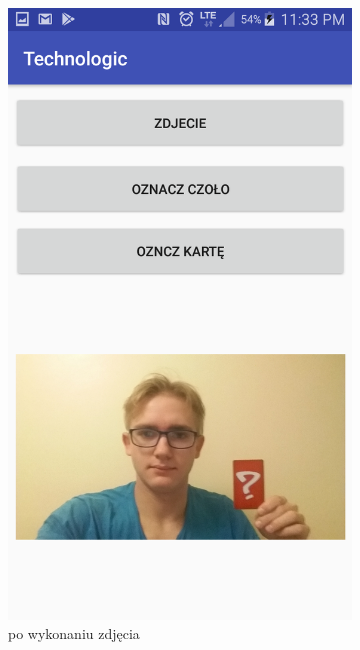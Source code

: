 \documentclass{article}
\numberwithin{equation}{section}
\begin{document}
\begin{figure}[H]
\begin{subfigure}{0.25\textwidth}
        \includegraphics[width=\linewidth]{czyste.png}
        \caption{po wykonaniu zdjęcia}
        \label{fig:pusteZdjecie}
    \end{subfigure}\hfill
    \begin{subfigure}{0.25\textwidth}
        \centering

\end{subfigure}
\end{figure}
\end{document}
